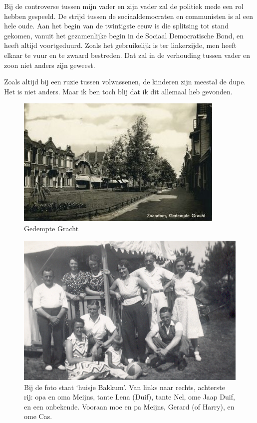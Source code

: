 \documentclass[12pt,twoside, openright]{memoir}
\begin{document}
Bij de controverse tussen mijn vader en zijn vader zal de politiek mede een rol hebben gespeeld. De strijd tussen de sociaaldemocraten en communisten is al een hele oude. Aan het begin van de twintigste eeuw is die splitsing tot stand gekomen, vanuit het gezamenlijke begin in de Sociaal Democratische Bond, en heeft altijd voortgeduurd. Zoals het gebruikelijk is ter linkerzijde, men heeft elkaar te vuur en te zwaard bestreden. Dat zal in de verhouding tussen vader en zoon niet anders zijn geweest. 

Zoals altijd bij een ruzie tussen volwassenen, de kinderen zijn meestal de dupe. Het is niet anders. Maar ik ben toch blij dat ik dit allemaal heb gevonden.

\begin{figure}
\includegraphics[width=\textwidth]{img/ch2/ch2-afb11}
\caption*{\footnotesize Gedempte Gracht}
\end{figure} 

\begin{figure}
\includegraphics[width=\textwidth]{img/ch2/ch2-afb12}
\caption*{\footnotesize Bij de foto staat ‘huisje Bakkum’. Van links naar rechts, achterste rij: opa en oma Meijns, tante Lena (Duif), tante Nel, ome Jaap Duif, en een onbekende. Vooraan moe en pa Meijns, Gerard (of Harry), en ome Cas.}
\end{figure}
\end{document}
